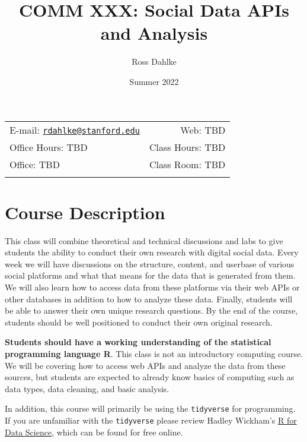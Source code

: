 \documentclass[11pt,]{article}
\title{COMM XXX: Social Data APIs and Analysis}
\author{Ross Dahlke}
\date{Summer 2022}
\begin{document}
  

		\maketitle
		
	
		\thispagestyle{firststyle}



	\noindent \begin{tabular*}{\textwidth}{ @{\extracolsep{\fill}} lr @{\extracolsep{\fill}}}


E-mail: \texttt{\href{mailto:rdahlke@stanford.edu}{\nolinkurl{rdahlke@stanford.edu}}} & Web: TBD\\
Office Hours: TBD  &  Class Hours: TBD\\
Office: TBD  & Class Room: TBD\\
	&  \\
	\hline
	\end{tabular*}
	
\vspace{2mm}
	


\hypertarget{course-description}{%
\section{Course Description}\label{course-description}}

This class will combine theoretical and technical discussions and labs
to give students the ability to conduct their own research with digital
social data. Every week we will have discussions on the structure,
content, and userbase of various social platforms and what that means
for the data that is generated from them. We will also learn how to
access data from these platforms via their web APIs or other databases
in addition to how to analyze these data. Finally, students will be able
to answer their own unique research questions. By the end of the course,
students should be well positioned to conduct their own original
research.

\textbf{Students should have a working understanding of the statistical
programming language R}. This class is not an introductory computing
course. We will be covering how to access web APIs and analyze the data
from these sources, but students are expected to already know basics of
computing such as data types, data cleaning, and basic analysis.

In addition, this course will primarily be using the \texttt{tidyverse}
for programming. If you are unfamiliar with the \texttt{tidyverse}
please review Hadley Wickham's \href{https://r4ds.had.co.nz/}{R for Data
Science}, which can be found for free online.
\end{document}
